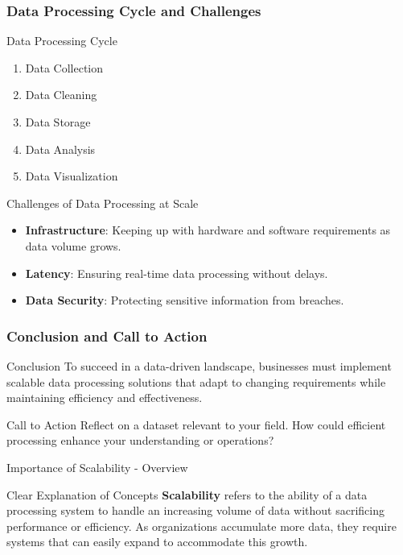 \documentclass[aspectratio=169]{beamer}
\begin{document}
\begin{frame}[fragile]
    \frametitle{Data Processing Cycle and Challenges}
    
    \begin{block}{Data Processing Cycle}
        \begin{enumerate}
            \item Data Collection
            \item Data Cleaning
            \item Data Storage
            \item Data Analysis
            \item Data Visualization
        \end{enumerate}
    \end{block}
    
    \begin{block}{Challenges of Data Processing at Scale}
        \begin{itemize}
            \item \textbf{Infrastructure}: Keeping up with hardware and software requirements as data volume grows.
            \item \textbf{Latency}: Ensuring real-time data processing without delays.
            \item \textbf{Data Security}: Protecting sensitive information from breaches.
        \end{itemize}
    \end{block}
\end{frame}

\begin{frame}[fragile]
    \frametitle{Conclusion and Call to Action}
    
    \begin{block}{Conclusion}
        To succeed in a data-driven landscape, businesses must implement scalable data processing solutions that adapt to changing requirements while maintaining efficiency and effectiveness.
    \end{block}
    
    \begin{block}{Call to Action}
        Reflect on a dataset relevant to your field. How could efficient processing enhance your understanding or operations?
    \end{block}
\end{frame}

\begin{frame}[fragile]{Importance of Scalability - Overview}
    \begin{block}{Clear Explanation of Concepts}
        \textbf{Scalability} refers to the ability of a data processing system to handle an increasing volume of data without sacrificing performance or efficiency. 
        As organizations accumulate more data, they require systems that can easily expand to accommodate this growth.
    \end{block}
\end{frame}
\end{document}
